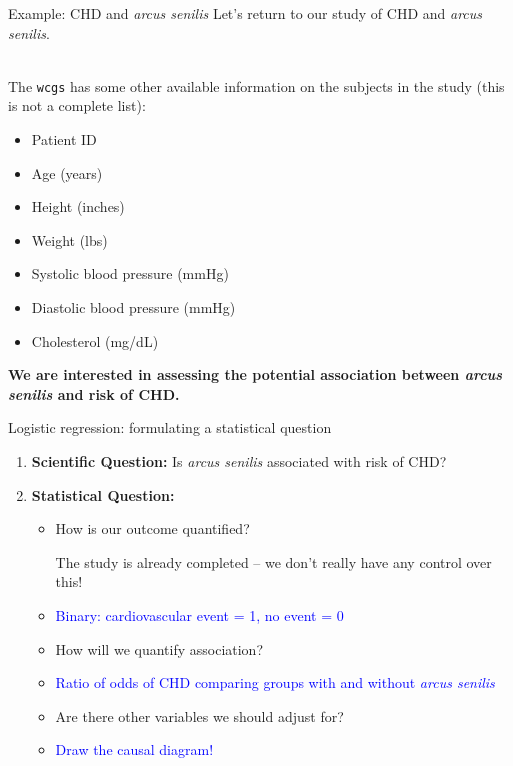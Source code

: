 \documentclass[10pt,t]{beamer}
\begin{document}
\begin{frame}{Example: CHD and \textit{arcus senilis}}
	Let's return to our study of CHD and \textit{arcus senilis}.
	\\ ~\
	
	The \texttt{wcgs} has some other available information on the subjects in the study (this is not a complete list):
	\begin{itemize}
		\item Patient ID
		\item Age (years)
		\item Height (inches)
		\item Weight (lbs)
		\item Systolic blood pressure (mmHg)
		\item Diastolic blood pressure (mmHg)
		\item Cholesterol (mg/dL)
	\end{itemize}  

	\textbf{We are interested in assessing the potential association between \textit{arcus senilis} and risk of CHD.} 
\end{frame}

\begin{frame}{Logistic regression: formulating a statistical question}
	\begin{enumerate}
		\item \textbf{Scientific Question:} \pause Is \textit{arcus senilis} associated with risk of CHD? \pause
		\item \textbf{Statistical Question:} \pause 
		\begin{itemize}
			\item How is our outcome quantified? \begin{tiny}The study is already completed -- we don't really have any control over this!\end{tiny}\pause
			\item[] \textcolor{blue}{Binary: cardiovascular event = 1, no event = 0}\pause
			\item How will we quantify association? \pause
			\item[] \textcolor{blue}{Ratio of odds of CHD comparing groups with and without \textit{arcus senilis}}\pause
			\item Are there other variables we should adjust for?\pause
			\item[] \textcolor{blue}{Draw the causal diagram!}\pause
		\end{itemize}
	\end{enumerate}
\end{frame}
\end{document}
